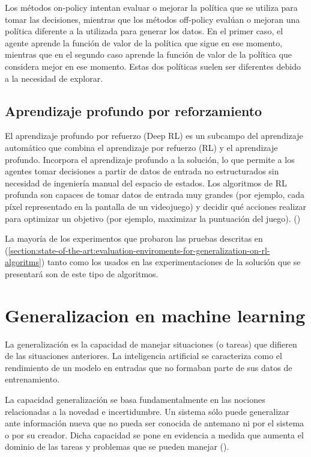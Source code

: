 Los métodos on-policy intentan evaluar o mejorar la política que se utiliza para tomar las decisiones, mientras que los métodos off-policy evalúan o mejoran una política diferente a la utilizada para generar los datos. En el primer caso, el agente aprende la función de valor de la política que sigue en ese momento, mientras que en el segundo caso aprende la función de valor de la política que considera mejor en ese momento. Estas dos políticas suelen ser diferentes debido a la necesidad de explorar.

\subsection{Aprendizaje profundo por reforzamiento}

El aprendizaje profundo por refuerzo (Deep RL) es un subcampo del aprendizaje automático que combina el aprendizaje por refuerzo (RL) y el aprendizaje profundo. Incorpora el aprendizaje profundo a la solución, lo que permite a los agentes tomar decisiones a partir de datos de entrada no estructurados sin necesidad de ingeniería manual del espacio de estados. Los algoritmos de RL profunda son capaces de tomar datos de entrada muy grandes (por ejemplo, cada píxel representado en la pantalla de un videojuego) y decidir qué acciones realizar para optimizar un objetivo (por ejemplo, maximizar la puntuación del juego). (\cite{franccois2018introduction})

La mayoría de los experimentos que probaron las pruebas descritas en (\ref{section:state-of-the-art:evaluation-enviroments-for-generalization-on-rl-algoritms}) tanto como los usados en las experimentaciones de la solución que se presentará son de este tipo de algoritmos.

\section{Generalizacion en machine learning}\label{section:state-of-the-art:generalization-on-machine-learning}

La generalización es la capacidad de manejar situaciones (o tareas) que difieren de las situaciones anteriores. La inteligencia artificial se caracteriza como el rendimiento de un modelo en entradas que no formaban parte de sus datos de entrenamiento.

La capacidad generalización se basa fundamentalmente en las nociones relacionadas a la novedad e incertidumbre. Un sistema sólo puede generalizar ante información nueva que no pueda ser conocida de antemano ni por el sistema o por su creador. Dicha capacidad se pone en evidencia a medida que aumenta el dominio de las tareas y problemas que se pueden manejar (\cite{chollet2019measure}).

